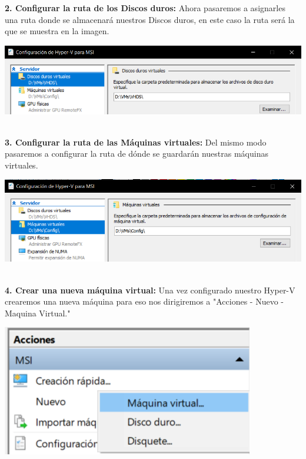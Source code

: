\begin{enumerate}
\textbf {2. Configurar la ruta de los Discos duros:} Ahora pasaremos a asignarles una ruta donde se almacenará nuestros Discos duros, en este caso la ruta será la que se muestra en la imagen.
\begin{center}
  \includegraphics[width=14cm]{Imagenes/Configuracion_Discos.png}
\end{center}
\vspace{12pt}\\


\textbf {3. Configurar la ruta de las Máquinas virtuales:} Del mismo modo pasaremos a configurar la ruta de dónde se guardarán nuestras máquinas virtuales.
\begin{center}
  \includegraphics[width=14cm]{Imagenes/Configuracion_Maquinas.png}
\end{center}
\vspace{12pt}\\

\textbf {4. Crear una nueva máquina virtual:} Una vez configurado nuestro Hyper-V crearemos una nueva máquina para eso nos dirigiremos a "Acciones - Nuevo - Maquina Virtual."
\begin{center}
  \includegraphics[width=11cm]{Imagenes/Nueva_Maquina.png}
\end{center}
\vspace{15pt}\\


\end{enumerate}
